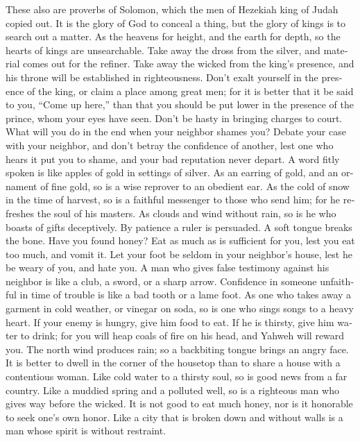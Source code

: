 \begin{paracol}{2}
\begin{otherlanguage}{english}
 These also are proverbs of Solomon, which the men of
Hezekiah king of Judah copied out.  It is the glory of God
to conceal a thing, but the glory of kings is to search out a matter.
 As the heavens for height, and the earth for depth, so
the hearts of kings are unsearchable.  Take away the dross
from the silver, and material comes out for the refiner. 
Take away the wicked from the king's presence, and his throne will be
established in righteousness.  Don't exalt yourself in the
presence of the king, or claim a place among great men; 
for it is better that it be said to you, ``Come up here,'' than that you
should be put lower in the presence of the prince, whom your eyes have
seen.  Don't be hasty in bringing charges to court. What
will you do in the end when your neighbor shames you? 
Debate your case with your neighbor, and don't betray the confidence of
another,  lest one who hears it put you to shame, and
your bad reputation never depart.  A word fitly spoken is
like apples of gold in settings of silver.  As an earring
of gold, and an ornament of fine gold, so is a wise reprover to an
obedient ear.  As the cold of snow in the time of
harvest, so is a faithful messenger to those who send him; for he
refreshes the soul of his masters.  As clouds and wind
without rain, so is he who boasts of gifts deceptively. 
By patience a ruler is persuaded. A soft tongue breaks the bone.
 Have you found honey? Eat as much as is sufficient for
you, lest you eat too much, and vomit it.  Let your foot
be seldom in your neighbor's house, lest he be weary of you, and hate
you.  A man who gives false testimony against his
neighbor is like a club, a sword, or a sharp arrow. 
Confidence in someone unfaithful in time of trouble is like a bad tooth
or a lame foot.  As one who takes away a garment in cold
weather, or vinegar on soda, so is one who sings songs to a heavy heart.
 If your enemy is hungry, give him food to eat. If he is
thirsty, give him water to drink;  for you will heap
coals of fire on his head, and Yahweh will reward you. 
The north wind produces rain; so a backbiting tongue brings an angry
face.  It is better to dwell in the corner of the
housetop than to share a house with a contentious woman. 
Like cold water to a thirsty soul, so is good news from a far country.
 Like a muddied spring and a polluted well, so is a
righteous man who gives way before the wicked.  It is not
good to eat much honey, nor is it honorable to seek one's own honor.
 Like a city that is broken down and without walls is a
man whose spirit is without restraint.


\end{otherlanguage}
\end{paracol}
